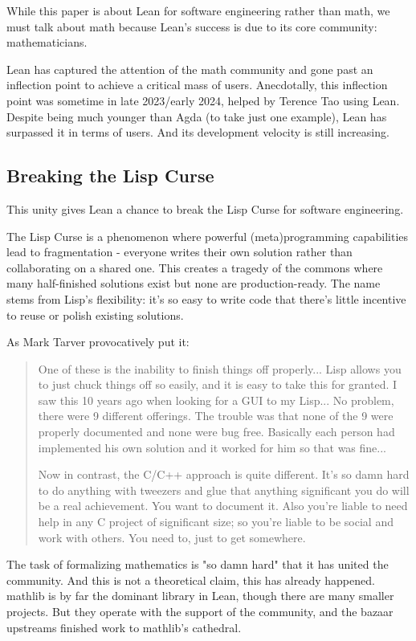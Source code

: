 \documentclass{article}
\begin{document}
While this paper is about Lean for software engineering rather than math, we must talk about math because Lean's success is due to its core community: mathematicians.

Lean has captured the attention of the math community and gone past an inflection point to achieve a critical mass of users. Anecdotally, this inflection point was sometime in late 2023/early 2024, helped by Terence Tao using Lean. Despite being much younger than Agda (to take just one example), Lean has surpassed it in terms of users. And its development velocity is still increasing.

\subsection{Breaking the Lisp Curse}

This unity gives Lean a chance to break the Lisp Curse for software engineering.

The Lisp Curse is a phenomenon where powerful (meta)programming capabilities lead to fragmentation - everyone writes their own solution rather than collaborating on a shared one. This creates a tragedy of the commons where many half-finished solutions exist but none are production-ready. The name stems from Lisp's flexibility: it's so easy to write code that there's little incentive to reuse or polish existing solutions.

As Mark Tarver provocatively put it: 

\begin{quote}
  One of these is the inability to finish things off properly... Lisp allows you to just chuck things off so easily, and it is easy to take this for granted. I saw this 10 years ago when looking for a GUI to my Lisp... No problem, there were 9 different offerings. The trouble was that none of the 9 were properly documented and none were bug free. Basically each person had implemented his own solution and it worked for him so that was fine...

  Now in contrast, the C/C++ approach is quite different. It's so damn hard to do anything with tweezers and glue that anything significant you do will be a real achievement. You want to document it. Also you're liable to need help in any C project of significant size; so you're liable to be social and work with others. You need to, just to get somewhere.
\end{quote}

The task of formalizing mathematics is "so damn hard" that it has united the community. And this is not a theoretical claim, this has already happened. mathlib is by far the dominant library in Lean, though there are many smaller projects. But they operate with the support of the community, and the bazaar  upstreams finished work to mathlib's cathedral. 
\end{document}
